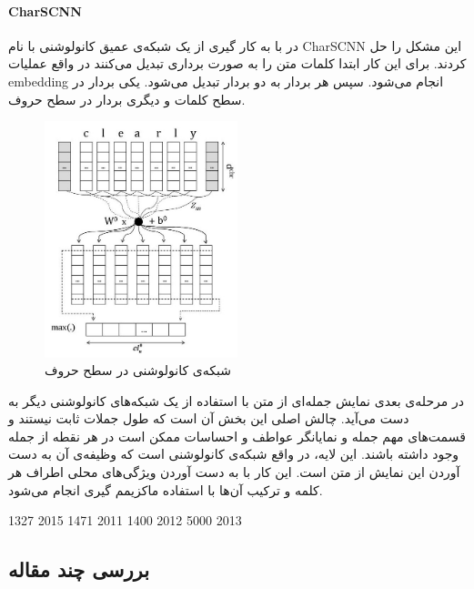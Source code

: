 \documentclass[12pt, a4paper, oneside]{report}
\begin{document}
\paragraph{CharSCNN} \hfill \break

در
\cite{dos2014deep}
با به کار گیری از یک شبکه‌ی عمیق کانولوشنی با نام
CharSCNN
این مشکل را حل کردند. برای این کار ابتدا کلمات متن را به صورت برداری تبدیل می‌کنند در واقع عملیات
embedding
انجام می‌شود. سپس هر بردار به دو بردار تبدیل می‌شود. یکی بردار در سطح کلمات و دیگری بردار در سطح حروف.

\begin{figure}[!ht]
    \centering
    \includegraphics[width=0.5\textwidth]{CHARCNN}
    \caption{ شبکه‌ی کانولوشنی در سطح حروف }
    \label{fig:CHARCNN}
\end{figure}

در مرحله‌ی بعدی نمایش جمله‌ای از متن با استفاده از یک شبکه‌های کانولوشنی دیگر به دست می‌آید.
چالش اصلی این بخش آن است که طول جملات ثابت نیستند و قسمت‌های مهم جمله و نمایانگر عواطف و احساسات
ممکن است در هر نقطه از جمله وجود داشته باشند. این لایه، در واقع شبکه‌ی کانولوشنی است که وظیفه‌ی آن
به دست آوردن این نمایش از متن است. این کار با به دست آوردن ویژگی‌های محلی اطراف هر کلمه و ترکیب
آن‌ها با استفاده ماکزیمم گیری انجام می‌شود.



\cite{tang-etal-2015-document} 1327 2015
\cite{socher-etal-2011-semi} 1471 2011
\cite{socher-etal-2012-semantic} 1400 2012
\cite{socher-etal-2013-recursive} 5000 2013




\subsection{بررسی چند مقاله}
\end{document}
